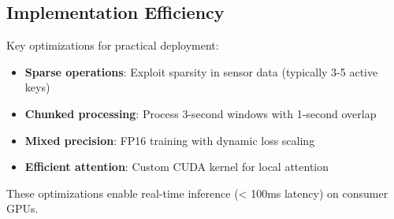 \subsection{Implementation Efficiency}

Key optimizations for practical deployment:
\begin{itemize}
\item \textbf{Sparse operations}: Exploit sparsity in sensor data (typically 3-5 active keys)
\item \textbf{Chunked processing}: Process 3-second windows with 1-second overlap
\item \textbf{Mixed precision}: FP16 training with dynamic loss scaling
\item \textbf{Efficient attention}: Custom CUDA kernel for local attention
\end{itemize}

These optimizations enable real-time inference (< 100ms latency) on consumer GPUs.